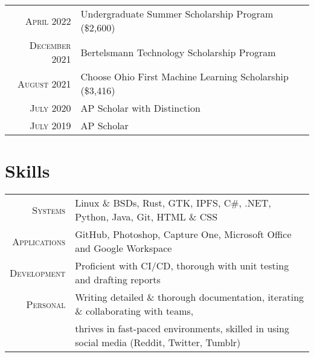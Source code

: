 \documentclass[a4paper,10pt]{article} %
\begin{document}
\begin{tabular}{rl}
\textsc{April 2022} & Undergraduate Summer Scholarship Program \footnotesize(\$2,600)\\
\textsc{December 2021} & Bertelsmann Technology Scholarship Program\\
\textsc{August 2021} & Choose Ohio First Machine Learning Scholarship \footnotesize(\$3,416)\normalsize\\
\textsc{July 2020} & AP Scholar with Distinction\\
\textsc{July 2019} & AP Scholar\\
\end{tabular}


\section{Skills}

\begin{tabular}{rl}
\textsc{Systems} & Linux \& BSDs, Rust, GTK, IPFS, C\#, .NET, Python, Java, Git, HTML \& CSS\\
\textsc{Applications} & GitHub, Photoshop, Capture One, Microsoft Office and Google Workspace\\
\textsc{Development} & Proficient with CI/CD, thorough with unit testing and drafting reports\\
\textsc{Personal} & Writing detailed \& thorough documentation, iterating \& collaborating with teams,\\& thrives in fast-paced environments, skilled in using social media \footnotesize(Reddit, Twitter, Tumblr)\normalsize\\

\end{tabular}
\end{document}
